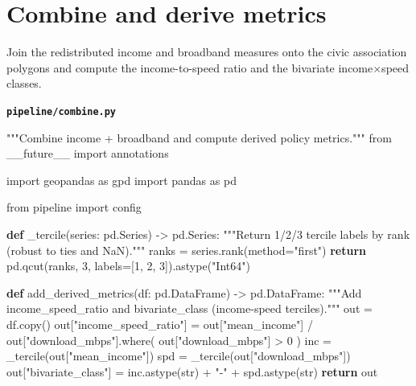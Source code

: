 \documentclass[
  letterpaper,
  DIV=11,
  numbers=noendperiod]{scrreprt}
\newenvironment{Shaded}{\begin{snugshade}}{\end{snugshade}}
\newcommand{\BuiltInTok}[1]{\textcolor[rgb]{0.00,0.23,0.31}{#1}}
\newcommand{\CommentTok}[1]{\textcolor[rgb]{0.37,0.37,0.37}{#1}}
\newcommand{\ControlFlowTok}[1]{\textcolor[rgb]{0.00,0.23,0.31}{\textbf{#1}}}
\newcommand{\DecValTok}[1]{\textcolor[rgb]{0.68,0.00,0.00}{#1}}
\newcommand{\ImportTok}[1]{\textcolor[rgb]{0.00,0.46,0.62}{#1}}
\newcommand{\KeywordTok}[1]{\textcolor[rgb]{0.00,0.23,0.31}{\textbf{#1}}}
\newcommand{\NormalTok}[1]{\textcolor[rgb]{0.00,0.23,0.31}{#1}}
\newcommand{\OperatorTok}[1]{\textcolor[rgb]{0.37,0.37,0.37}{#1}}
\newcommand{\StringTok}[1]{\textcolor[rgb]{0.13,0.47,0.30}{#1}}
\begin{document}
\section{Combine and derive metrics}\label{combine-and-derive-metrics}

Join the redistributed income and broadband measures onto the civic
association polygons and compute the income-to-speed ratio and the
bivariate income×speed classes.

\textbf{\texttt{pipeline/combine.py}}

\begin{Shaded}
\begin{Highlighting}[]
\CommentTok{"""Combine income + broadband and compute derived policy metrics."""}
\ImportTok{from}\NormalTok{ \_\_future\_\_ }\ImportTok{import}\NormalTok{ annotations}

\ImportTok{import}\NormalTok{ geopandas }\ImportTok{as}\NormalTok{ gpd}
\ImportTok{import}\NormalTok{ pandas }\ImportTok{as}\NormalTok{ pd}

\ImportTok{from}\NormalTok{ pipeline }\ImportTok{import}\NormalTok{ config}


\KeywordTok{def}\NormalTok{ \_tercile(series: pd.Series) }\OperatorTok{{-}\textgreater{}}\NormalTok{ pd.Series:}
    \CommentTok{"""Return 1/2/3 tercile labels by rank (robust to ties and NaN)."""}
\NormalTok{    ranks }\OperatorTok{=}\NormalTok{ series.rank(method}\OperatorTok{=}\StringTok{"first"}\NormalTok{)}
    \ControlFlowTok{return}\NormalTok{ pd.qcut(ranks, }\DecValTok{3}\NormalTok{, labels}\OperatorTok{=}\NormalTok{[}\DecValTok{1}\NormalTok{, }\DecValTok{2}\NormalTok{, }\DecValTok{3}\NormalTok{]).astype(}\StringTok{"Int64"}\NormalTok{)}


\KeywordTok{def}\NormalTok{ add\_derived\_metrics(df: pd.DataFrame) }\OperatorTok{{-}\textgreater{}}\NormalTok{ pd.DataFrame:}
    \CommentTok{"""Add income\_speed\_ratio and bivariate\_class (income{-}speed terciles)."""}
\NormalTok{    out }\OperatorTok{=}\NormalTok{ df.copy()}
\NormalTok{    out[}\StringTok{"income\_speed\_ratio"}\NormalTok{] }\OperatorTok{=}\NormalTok{ out[}\StringTok{"mean\_income"}\NormalTok{] }\OperatorTok{/}\NormalTok{ out[}\StringTok{"download\_mbps"}\NormalTok{].where(}
\NormalTok{        out[}\StringTok{"download\_mbps"}\NormalTok{] }\OperatorTok{\textgreater{}} \DecValTok{0}
\NormalTok{    )}
\NormalTok{    inc }\OperatorTok{=}\NormalTok{ \_tercile(out[}\StringTok{"mean\_income"}\NormalTok{])}
\NormalTok{    spd }\OperatorTok{=}\NormalTok{ \_tercile(out[}\StringTok{"download\_mbps"}\NormalTok{])}
\NormalTok{    out[}\StringTok{"bivariate\_class"}\NormalTok{] }\OperatorTok{=}\NormalTok{ inc.astype(}\BuiltInTok{str}\NormalTok{) }\OperatorTok{+} \StringTok{"{-}"} \OperatorTok{+}\NormalTok{ spd.astype(}\BuiltInTok{str}\NormalTok{)}
    \ControlFlowTok{return}\NormalTok{ out}



\end{Highlighting}
\end{Shaded}
\end{document}
